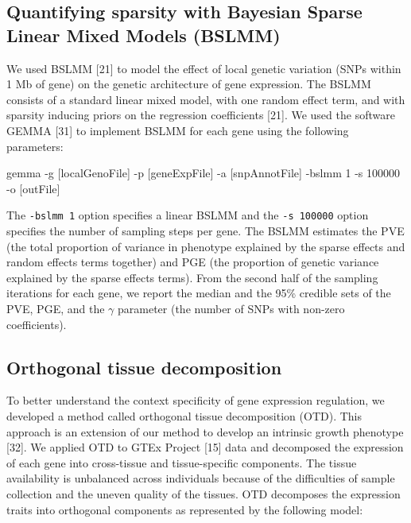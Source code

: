 \documentclass[]{article}
\newenvironment{Shaded}{\begin{snugshade}}{\end{snugshade}}
\newcommand{\DecValTok}[1]{\textcolor[rgb]{0.00,0.00,0.81}{{#1}}}
\newcommand{\NormalTok}[1]{{#1}}
\begin{document}
\subsection{Quantifying sparsity with Bayesian Sparse Linear Mixed
Models
(BSLMM)}\label{quantifying-sparsity-with-bayesian-sparse-linear-mixed-models-bslmm}

We used BSLMM {[}21{]} to model the effect of local genetic variation
(SNPs within 1 Mb of gene) on the genetic architecture of gene
expression. The BSLMM consists of a standard linear mixed model, with
one random effect term, and with sparsity inducing priors on the
regression coefficients {[}21{]}. We used the software GEMMA {[}31{]} to
implement BSLMM for each gene using the following parameters:

\begin{Shaded}
\begin{Highlighting}[]
\NormalTok{gemma -g [localGenoFile] -p [geneExpFile] -a [snpAnnotFile] -bslmm }\DecValTok{1} \NormalTok{-s }\DecValTok{100000} \NormalTok{-o [outFile]}
\end{Highlighting}
\end{Shaded}

The \texttt{-bslmm 1} option specifies a linear BSLMM and the
\texttt{-s 100000} option specifies the number of sampling steps per
gene. The BSLMM estimates the PVE (the total proportion of variance in
phenotype explained by the sparse effects and random effects terms
together) and PGE (the proportion of genetic variance explained by the
sparse effects terms). From the second half of the sampling iterations
for each gene, we report the median and the 95\% credible sets of the
PVE, PGE, and the \textbar{}\(\gamma\)\textbar{} parameter (the number
of SNPs with non-zero coefficients).

\subsection{Orthogonal tissue
decomposition}\label{orthogonal-tissue-decomposition}

To better understand the context specificity of gene expression
regulation, we developed a method called orthogonal tissue decomposition
(OTD). This approach is an extension of our method to develop an
intrinsic growth phenotype {[}32{]}. We applied OTD to GTEx Project
{[}15{]} data and decomposed the expression of each gene into
cross-tissue and tissue-specific components. The tissue availability is
unbalanced across individuals because of the difficulties of sample
collection and the uneven quality of the tissues. OTD decomposes the
expression traits into orthogonal components as represented by the
following model:
\end{document}
